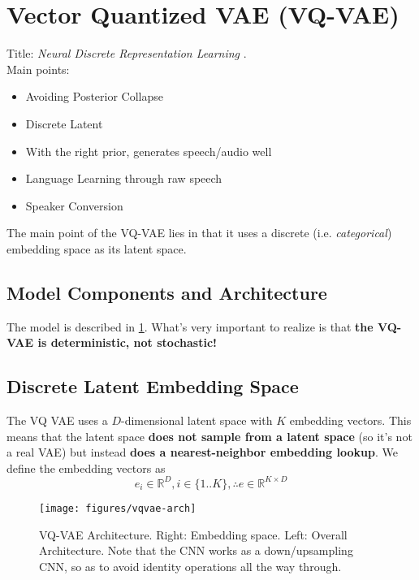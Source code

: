 \section{Vector Quantized VAE (VQ-VAE)}
Title:  \textit{Neural Discrete Representation Learning} \cite{oord_neural_2018}.
\\



Main points: 
\begin{itemize}
    \item Avoiding Posterior Collapse
    \item Discrete Latent
    \item With the right prior, generates speech/audio well  %
    \item Language Learning through raw speech
    \item Speaker Conversion
\end{itemize}


The main point of the VQ-VAE lies in that it uses a discrete (i.e. \textit{categorical}) embedding space as its latent space. 


\subsection{Model Components and Architecture}
The model is described in \cref{fig:vqvae-arch}.
What's very important to realize is that \textbf{the VQ-VAE is deterministic, not stochastic!}

\subsection{Discrete Latent Embedding Space}
The VQ VAE uses a \(D\)-dimensional latent space with \(K\) embedding vectors.
This means that the latent space \textbf{does not sample from a latent space} (so it's not a real VAE) but instead \textbf{does a nearest-neighbor embedding lookup}. 
We define the embedding vectors as 
\[
  e_i \in \mathbb{R}^D, i \in \{1 .. K\}, \therefore e \in \mathbb{R}^{K \times D}
\]

\begin{figure}[ht]
    \begin{small}
        \begin{center}
            \texttt{[image: figures/vqvae-arch]}
        \end{center}
        \caption{VQ-VAE Architecture. 
        Right: Embedding space. 
        Left: Overall Architecture. 
        Note that the CNN works as a down/upsampling CNN, so as to avoid identity operations all the way through. 
        }
        \label{fig:vqvae-arch}
    \end{small}
\end{figure}

